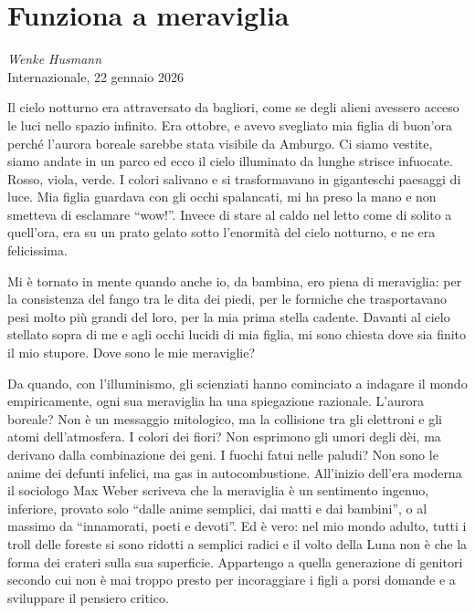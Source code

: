 \documentclass[11pt]{report}
\begin{document}
\chapter*{Funziona a meraviglia}
\begin{flushright}
    \textit{Wenke Husmann}\\
    {\small Internazionale, 22 gennaio 2026}
\end{flushright}

\lettrine[lines=3]{I}{}l cielo notturno era attraversato da bagliori, come se degli alieni avessero acceso le luci nello spazio infinito. Era ottobre, e avevo svegliato mia figlia di buon’ora perché l’aurora boreale sarebbe stata visibile da Amburgo. Ci siamo vestite, siamo andate in un parco ed ecco il cielo illuminato da lunghe strisce infuocate. Rosso, viola, verde. I colori salivano e si trasformavano in giganteschi paesaggi di luce. Mia figlia guardava con gli occhi spalancati, mi ha preso la mano e non smetteva di esclamare “wow!”. Invece di stare al caldo nel letto come di solito a quell’ora, era su un prato gelato sotto l’enormità del cielo notturno, e ne era felicissima.

Mi è tornato in mente quando anche io, da bambina, ero piena di meraviglia: per la consistenza del fango tra le dita dei piedi, per le formiche che trasportavano pesi molto più grandi del loro, per la mia prima stella cadente. Davanti al cielo stellato sopra di me e agli occhi lucidi di mia figlia, mi sono chiesta dove sia finito il mio stupore. Dove sono le mie meraviglie?

Da quando, con l’illuminismo, gli scienziati hanno cominciato a indagare il mondo empiricamente, ogni sua meraviglia ha una spiegazione razionale. L’aurora boreale? Non è un messaggio mitologico, ma la collisione tra gli elettroni e gli atomi dell’atmosfera. I colori dei fiori? Non esprimono gli umori degli dèi, ma derivano dalla combinazione dei geni. I fuochi fatui nelle paludi? Non sono le anime dei defunti infelici, ma gas in autocombustione. All’inizio dell’era moderna il sociologo Max Weber scriveva che la meraviglia è un sentimento ingenuo, inferiore, provato solo “dalle anime semplici, dai matti e dai bambini”, o al massimo da “innamorati, poeti e devoti”. Ed è vero: nel mio mondo adulto, tutti i troll delle foreste si sono ridotti a semplici radici e il volto della Luna non è che la forma dei crateri sulla sua superficie. Appartengo a quella generazione di genitori secondo cui non è mai troppo presto per incoraggiare i figli a porsi domande e a sviluppare il pensiero critico.
\end{document}
